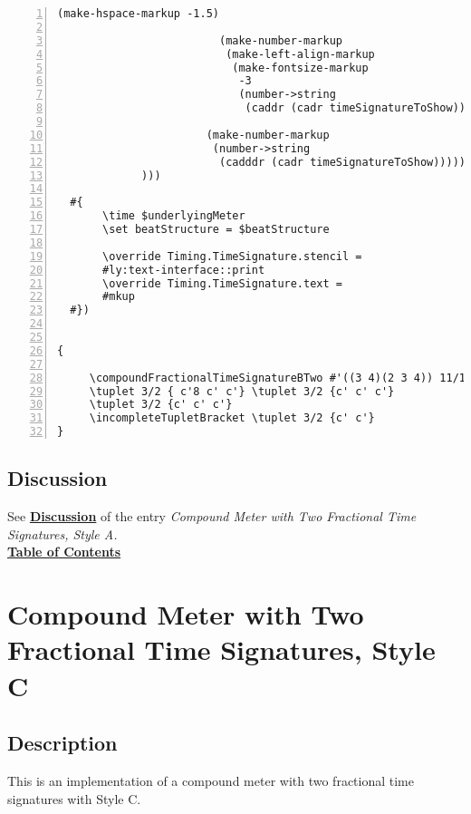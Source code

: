 \begin{Verbatim}[numbers=left,xleftmargin=5mm]
                         (make-hspace-markup -1.5)

                         (make-number-markup
                          (make-left-align-markup
                           (make-fontsize-markup
                            -3
                            (number->string
                             (caddr (cadr timeSignatureToShow))))))))

                       (make-number-markup
                        (number->string
                         (cadddr (cadr timeSignatureToShow)))))))))
             )))

  #{
       \time $underlyingMeter
       \set beatStructure = $beatStructure

       \override Timing.TimeSignature.stencil =
       #ly:text-interface::print
       \override Timing.TimeSignature.text =
       #mkup
  #})


{

     \compoundFractionalTimeSignatureBTwo #'((3 4)(2 3 4)) 11/12 3,3,3,2
     \tuplet 3/2 { c'8 c' c'} \tuplet 3/2 {c' c' c'}
     \tuplet 3/2 {c' c' c'}
     \incompleteTupletBracket \tuplet 3/2 {c' c'}
}
\end{Verbatim}
\subsection{Discussion}
See \hyperref[sec:compoundfractionalmeter_discussion]{\textbf{Discussion}} of the entry \textit{Compound Meter with Two Fractional Time Signatures, Style A.} \\
\hyperref[sec:toc]{\textbf{Table of Contents}}

\vfill \break




\section {Compound Meter with Two Fractional Time Signatures, Style C}

\hfill
{}
\hfill

\subsection{Description}
This is an implementation of a compound meter with two fractional time signatures with Style C.  

